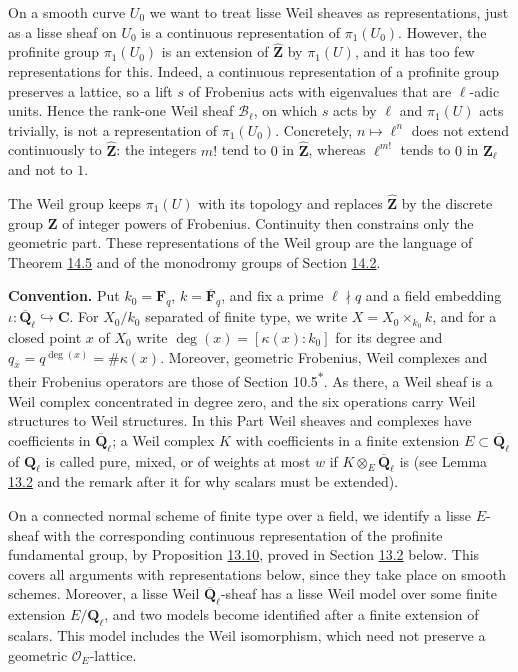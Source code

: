 \documentclass[11pt]{article}
\newcommand{\bpout}[1]{#1\textsuperscript{\hyperlink{bp-outside}{\ensuremath{\ast}}}}
\begin{document}
On a smooth curve \(U_0\) we want to treat lisse Weil sheaves as representations, just as a lisse sheaf on \(U_0\) is a continuous representation of \(\pi_1(U_0)\). However, the profinite group \(\pi_1(U_0)\) is an extension of \(\widehat{\mathbf Z}\) by \(\pi_1(U)\), and it has too few representations for this. Indeed, a continuous representation of a profinite group preserves a lattice, so a lift \(s\) of Frobenius acts with eigenvalues that are \(\ell\)-adic units. Hence the rank-one Weil sheaf \(\mathcal B_\ell\), on which \(s\) acts by \(\ell\) and \(\pi_1(U)\) acts trivially, is not a representation of \(\pi_1(U_0)\). Concretely, \(n\mapsto\ell^n\) does not extend continuously to \(\widehat{\mathbf Z}\): the integers \(m!\) tend to \(0\) in \(\widehat{\mathbf Z}\), whereas \(\ell^{m!}\) tends to \(0\) in \(\mathbf Z_\ell\) and not to \(1\).

The Weil group keeps \(\pi_1(U)\) with its topology and replaces \(\widehat{\mathbf Z}\) by the discrete group \(\mathbf Z\) of integer powers of Frobenius. Continuity then constrains only the geometric part. These representations of the Weil group are the language of Theorem \hyperref[bp58]{14.5} and of the monodromy groups of Section \hyperref[bp69]{14.2}.

\label{bp7}%
\textbf{Convention.} Put \(k_0=\mathbf F_q\), \(k=\overline{\mathbf F}_q\), and fix a prime \(\ell\nmid q\) and a field embedding \(\iota:\overline{\mathbf Q}_\ell\hookrightarrow\mathbf C\). For \(X_0/k_0\) separated of finite type, we write \(X=X_0\times_{k_0}k\), and for a closed point \(x\) of \(X_0\) write \(\deg(x)=[\kappa(x):k_0]\) for its degree and \(q_x=q^{\deg(x)}=\#\kappa(x)\). Moreover, geometric Frobenius, Weil complexes and their Frobenius operators are those of Section \bpout{10.5}. As there, a Weil sheaf is a Weil complex concentrated in degree zero, and the six operations carry Weil structures to Weil structures. In this Part Weil sheaves and complexes have coefficients in \(\overline{\mathbf Q}_\ell\); a Weil complex \(K\) with coefficients in a finite extension \(E\subset\overline{\mathbf Q}_\ell\) of \(\mathbf Q_\ell\) is called pure, mixed, or of weights at most \(w\) if \(K\otimes_E\overline{\mathbf Q}_\ell\) is (see Lemma \hyperref[bp11]{13.2} and the remark after it for why scalars must be extended).

On a connected normal scheme of finite type over a field, we identify a lisse \(E\)-sheaf with the corresponding continuous representation of the profinite fundamental group, by Proposition \hyperref[bp34]{13.10}, proved in Section \hyperref[bp26]{13.2} below. This covers all arguments with representations below, since they take place on smooth schemes. Moreover, a lisse Weil \(\overline{\mathbf Q}_\ell\)-sheaf has a lisse Weil model over some finite extension \(E/\mathbf Q_\ell\), and two models become identified after a finite extension of scalars. This model includes the Weil isomorphism, which need not preserve a geometric \(\mathcal O_E\)-lattice.
\end{document}
